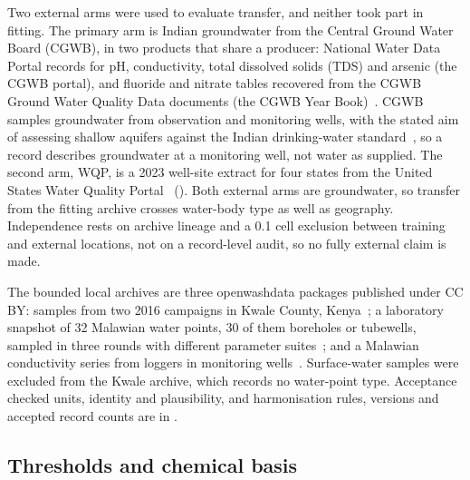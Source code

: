 \documentclass[10pt,letterpaper]{article}
\begin{document}
Two external arms were used to evaluate transfer, and neither took part in fitting. The primary arm is Indian groundwater from the Central Ground Water Board (CGWB), in two products that share a producer: National Water Data Portal records for pH, conductivity, total dissolved solids (TDS) and arsenic (the CGWB portal), and fluoride and nitrate tables recovered from the CGWB Ground Water Quality Data documents (the CGWB Year Book)~\cite{CGWB-NWDP,CGWB-GWQ2019,CGWB-GWQ2021,CGWB-GWQ2022}. CGWB samples groundwater from observation and monitoring wells, with the stated aim of assessing shallow aquifers against the Indian drinking-water standard~\cite{CGWB-AGWQR2025}, so a record describes groundwater at a monitoring well, not water as supplied. The second arm, WQP, is a 2023 well-site extract for four states from the United States Water Quality Portal~\cite{WQP} (). Both external arms are groundwater, so transfer from the fitting archive crosses water-body type as well as geography. Independence rests on archive lineage and a 0.1\textdegree{} cell exclusion between training and external locations, not on a record-level audit, so no fully external claim is made.

The bounded local archives are three openwashdata packages published under CC BY: samples from two 2016 campaigns in Kwale County, Kenya~\cite{OWD-grdwtrsmpkwale}; a laboratory snapshot of 32 Malawian water points, 30 of them boreholes or tubewells, sampled in three rounds with different parameter suites~\cite{OWD-boreholelabdata}; and a Malawian conductivity series from loggers in monitoring wells~\cite{OWD-mwgroundwaterdata}. Surface-water samples were excluded from the Kwale archive, which records no water-point type. Acceptance checked units, identity and plausibility, and harmonisation rules, versions and accepted record counts are in .

\subsection*{Thresholds and chemical basis}
\end{document}
